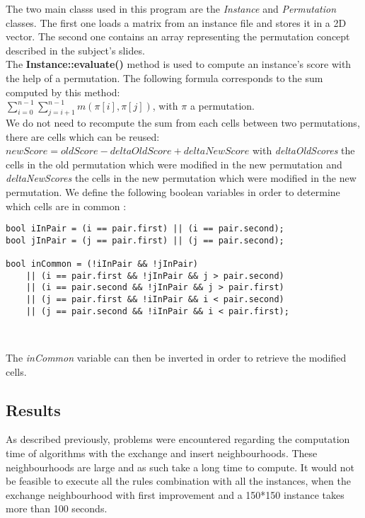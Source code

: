 The two main classs used in this program are the \emph{Instance} and
\emph{Permutation} classes. The first one loads a matrix from an instance file
and stores it in a 2D vector. The second one contains an array representing the
permutation concept described in the subject's slides.\\

The \textbf{Instance::evaluate()} method is used to compute an instance's score
with the help of a permutation. The following formula corresponds to the sum
computed by this method:\\
$\sum_{i=0}^{n-1} \sum_{j=i+1}^{n-1} m(\pi[i], \pi[j])$, with $\pi$ a permutation.\\

We do not need to recompute the sum from each cells between two permutations,
there are cells which can be reused: $newScore = oldScore - deltaOldScore + deltaNewScore$ with \emph{deltaOldScores} the cells in the old permutation which were modified
in the new permutation and \emph{deltaNewScores} the cells in the new permutation
which were modified in the new permutation. We define the following boolean
variables in order to determine which cells are in common :\\

\begin{lstlisting}
bool iInPair = (i == pair.first) || (i == pair.second);
bool jInPair = (j == pair.first) || (j == pair.second);

bool inCommon = (!iInPair && !jInPair)
    || (i == pair.first && !jInPair && j > pair.second)
    || (i == pair.second && !jInPair && j > pair.first)
    || (j == pair.first && !iInPair && i < pair.second)
    || (j == pair.second && !iInPair && i < pair.first);
\end{lstlisting}
\

\noindent The \emph{inCommon} variable can then be inverted in order to retrieve the
modified cells.

\newpage

\subsection{Results}

As described previously, problems were encountered regarding the computation time
of algorithms with the exchange and insert neighbourhoods. These neighbourhoods
are large and as such take a long time to compute. It would not be feasible to
execute all the rules combination with all the instances, when the exchange
neighbourhood with first improvement and a 150*150 instance takes more than
100 seconds.\\

